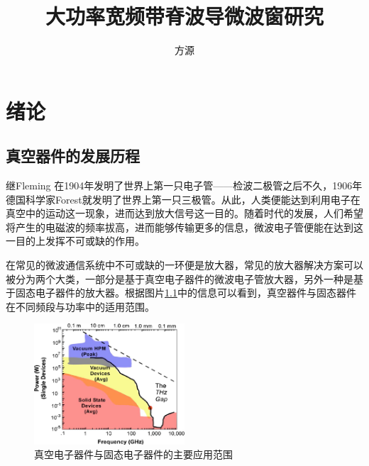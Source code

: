 \documentclass[master]{thesis-uestc}
\title{大功率宽频带脊波导微波窗研究}{English Title} %
\author{方源}{English Name} %
\begin{document}
\makecover %
\originalitydeclaration %
\begin{chineseabstract}

\end{chineseabstract}
\begin{englishabstract}

\end{englishabstract}

\thesistableofcontents %



\chapter{绪\hspace{6pt}论}
\section{真空器件的发展历程}
继Fleming 在1904年发明了世界上第一只电子管——检波二极管之后不久，1906年德国科学家Forest就发明了世界上第一只三极管。从此，人类便能达到利用电子在真空中的运动这一现象，进而达到放大信号这一目的。随着时代的发展，人们希望将产生的电磁波的频率拔高，进而能够传输更多的信息，微波电子管便能在达到这一目的上发挥不可或缺的作用。

在常见的微波通信系统中不可或缺的一环便是放大器，常见的放大器解决方案可以被分为两个大类，一部分是基于真空电子器件的微波电子管放大器，另外一种是基于固态电子器件的放大器。根据图片\ref{fig:真空电子器件与固态电子器件的主要应用范围}中的信息可以看到，真空器件与固态器件在不同频段与功率中的适用范围。
\begin{figure}[!htb]
    \centering
    \includegraphics[width=0.5\textwidth]{pic/chapter1/器件平均功率-频率示意图.png}
    \caption{真空电子器件与固态电子器件的主要应用范围}
    \label{fig:真空电子器件与固态电子器件的主要应用范围}
\end{figure}
\end{document}
